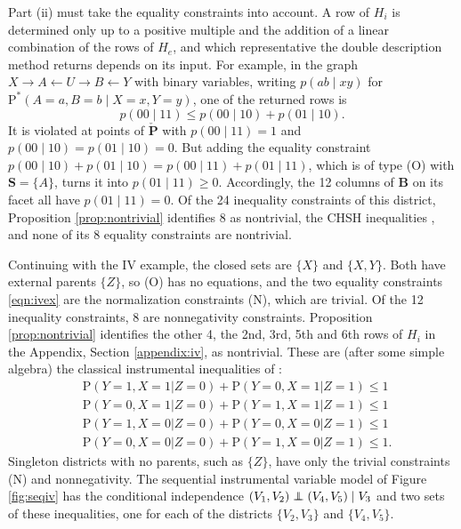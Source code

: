 \documentclass[12pt]{article}
\newcommand\indep{\protect\mathpalette{\protect\independenT}{\perp}}
\def\independenT#1#2{\mathrel{\rlap{$#1#2$}\mkern2mu{#1#2}}}
\def\Pr{{\mathrm{P}}}
\def\Pdo{{\mathrm{P}^*}}
\newcommand{\bS}{\boldsymbol{S}}
\begin{document}
Part (ii) must take the equality constraints into account. A row of $H_i$ is determined only up to a positive multiple and the addition of a linear combination of the rows of $H_e$, and which representative the double description method returns depends on its input. For example, in the graph $X \rightarrow A \leftarrow U \rightarrow B \leftarrow Y$ with binary variables, writing $p(ab \mid xy)$ for $\Pdo(A = a, B = b \mid X = x, Y = y)$, one of the returned rows is
\[
p(00 \mid 11) \leq p(00 \mid 10) + p(01 \mid 10).
\]
It is violated at points of $\boldsymbol{\check{P}}$ with $p(00 \mid 11) = 1$ and $p(00 \mid 10) = p(01 \mid 10) = 0$. But adding the equality constraint $p(00 \mid 10) + p(01 \mid 10) = p(00 \mid 11) + p(01 \mid 11)$, which is of type (O) with $\bS = \{A\}$, turns it into $p(01 \mid 11) \geq 0$. Accordingly, the 12 columns of $\boldsymbol{B}$ on its facet all have $p(01 \mid 11) = 0$. Of the 24 inequality constraints of this district, Proposition \ref{prop:nontrivial} identifies 8 as nontrivial, the CHSH inequalities \citep{clauser1969proposed}, and none of its 8 equality constraints are nontrivial.


Continuing with the IV example, the closed sets are $\{X\}$ and $\{X, Y\}$. Both have external parents $\{Z\}$, so (O) has no equations, and the two equality constraints \eqref{eqn:ivex} are the normalization constraints (N), which are trivial. Of the 12 inequality constraints, 8 are nonnegativity constraints. Proposition \ref{prop:nontrivial} identifies the other 4, the 2nd, 3rd, 5th and 6th rows of $H_i$ in the Appendix, Section \ref{appendix:iv}, as nontrivial. These are (after some simple algebra) the classical instrumental inequalities of \citet{pearl1995testability}:
\begin{align*}
 & \Pr(Y = 1,X = 1|Z = 0) + \Pr(Y = 0,X = 1|Z = 1) \leq 1 \\
& \Pr(Y = 0,X = 1|Z = 0) + \Pr(Y = 1,X = 1|Z = 1)  \leq 1 \\
& \Pr(Y = 1,X = 0|Z = 0) + \Pr(Y = 0,X = 0|Z = 1) \leq 1 \\
& \Pr(Y = 0,X = 0|Z = 0) + \Pr(Y = 1,X = 0|Z = 1) \leq 1.
\end{align*}
Singleton districts with no parents, such as $\{Z\}$, have only the trivial constraints (N) and nonnegativity. The sequential instrumental variable model of Figure \ref{fig:seqiv} has the conditional independence $(V_1, V_2) \indep (V_4, V_5) \mid V_3$ and two sets of these inequalities, one for each of the districts $\{V_2, V_3\}$ and $\{V_4, V_5\}$.
\end{document}
